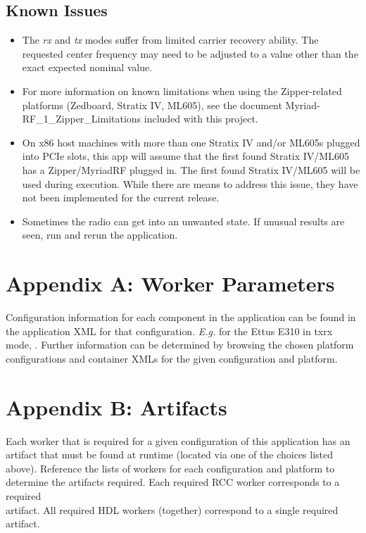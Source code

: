 \subsection{Known Issues}
\noindent
\begin{itemize}
  \item The \textit{rx} and \textit{tx} modes suffer from limited carrier recovery ability. The requested center frequency may need to be adjusted to a value other than the exact expected nominal value.
  \item For more information on known limitations when using the Zipper-related platforms (Zedboard, Stratix IV, ML605), see the document Myriad-RF\_1\_Zipper\_Limitations included with this project.
  \item  On x86 host machines with more than one Stratix IV and/or ML605s plugged into PCIe slots, this app will assume that the first found Stratix IV/ML605 has a Zipper/MyriadRF plugged in. The first found Stratix IV/ML605 will be used during execution. While there are means to address this issue, they have not been implemented for the current release.
  \item Sometimes the radio can get into an unwanted state. If unusual results are seen, run  and rerun the application.
\end{itemize}

\pagebreak
\section{Appendix A: Worker Parameters}
Configuration information for each component in the application can be found in the application XML for that configuration. \textit{E.g.} for the Ettus E310 in txrx mode, . Further information can be determined by browsing the chosen platform configurations and container XMLs for the given configuration and platform.
\section{Appendix B: Artifacts}
Each worker that is required for a given configuration of this application has an artifact that must be found at runtime (located via one of the  choices listed above). Reference the lists of workers for each configuration and platform to determine the artifacts required. Each required RCC worker corresponds to a required \\
 artifact. All required HDL workers (together) correspond to a single required  artifact.\\
